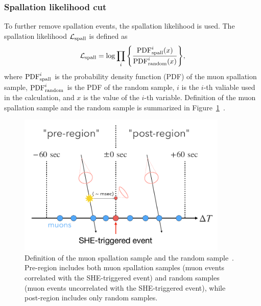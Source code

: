 \subsubsection{Spallation likelihood cut}
\vs\hs
To further remove spallation events, the spallation likelihood is used.
The spallation likelihood $\mathcal{L}_{\rm spall}$ is defined as
\begin{eqnarray}
	\mathcal{L}_{\rm spall} = {\rm log}\prod_{i} \Bigg\{{{\rm PDF}^{i}_{\rm spall}(x) \over {\rm PDF}^{i}_{\rm random}(x)}\Bigg\},
\end{eqnarray}
where ${\rm PDF}^{i}_{\rm spall}$ is the probability density function (PDF) of the muon spallation sample, ${\rm PDF}^{i}_{\rm random}$ is the PDF of the random sample, $i$ is the $i$-th valiable used in the calculation, and $x$ is the value of the $i$-th variable.
Definition of the muon spallation sample and the random sample is summarized in Figure~\ref{Selection_pre_post}~\cite{2023HaradaPhD}.

\begin{figure}[tbp]
	\centering
	\includegraphics[width=10cm]{Figures/Selection/pre_post}
	\caption[Definition of the muon spallation sample and the random sample]{
	Definition of the muon spallation sample and the random sample~\cite{2023HaradaPhD}.
	Pre-region includes both muon spallation samples (muon events correlated with the SHE-triggered event) and random samples (muon events uncorrelated with the SHE-triggered event), while post-region includes only random samples.
	}\label{Selection_pre_post}
\end{figure}

